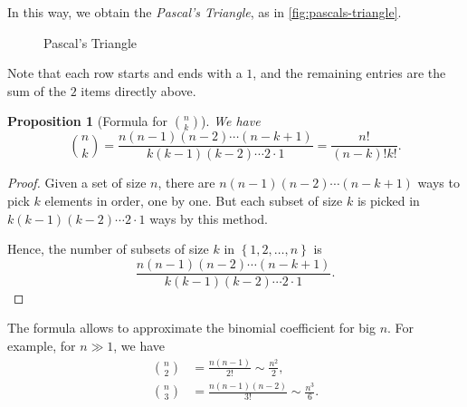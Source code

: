 \documentclass{article}
\newtheorem{proposition}[theorem]{Proposition}
\theoremstyle{definition}
\theoremstyle{remark}
\newcommand{\pqty}[1]{\left(#1\right)}
\newcommand{\Bqty}[1]{\left\{#1\right\}}
\begin{document}
In this way, we obtain the \emph{Pascal's Triangle}, as in \autoref{fig:pascals-triangle}.

\begin{figure}[ht!]
    \centering
    \caption{Pascal's Triangle}
    \label{fig:pascals-triangle}
\end{figure}

Note that each row starts and ends with a \(1\), and the remaining entries are the sum of the \(2\) items directly above.

\begin{proposition}[Formula for \(\binom{n}{k}\)]
    We have
    \[
        \binom{n}{k} = \frac{n \pqty{n - 1} \pqty{n - 2} \cdots \pqty{n - k + 1}}{k \pqty{k - 1} \pqty{k - 2} \cdots 2 \cdot 1} = \frac{n!}{\pqty{n - k}! k!}.
    \]
\end{proposition}

\begin{proof}
    Given a set of size \(n\), there are \(n \pqty{n - 1} \pqty{n - 2} \cdots \pqty{n - k + 1}\) ways to pick \(k\) elements in order, one by one. But each subset of size \(k\) is picked in \(k \pqty{k - 1} \pqty{k - 2} \cdots 2 \cdot 1\) ways by this method.

    Hence, the number of subsets of size \(k\) in \(\Bqty{1, 2, \ldots, n}\) is
    \[
        \frac{n \pqty{n - 1} \pqty{n - 2} \cdots \pqty{n - k + 1}}{k \pqty{k - 1} \pqty{k - 2} \cdots 2 \cdot 1}.
    \]
\end{proof}

The formula allows to approximate the binomial coefficient for big \(n\). For example, for \(n \gg 1\), we have
\begin{align*}
    \binom{n}{2} &= \frac{n \pqty{n - 1}}{2!} \sim \frac{n^2}{2}, \\
    \binom{n}{3} &= \frac{n \pqty{n - 1} \pqty{n - 2}}{3!} \sim \frac{n^3}{6}.
\end{align*}
\end{document}
